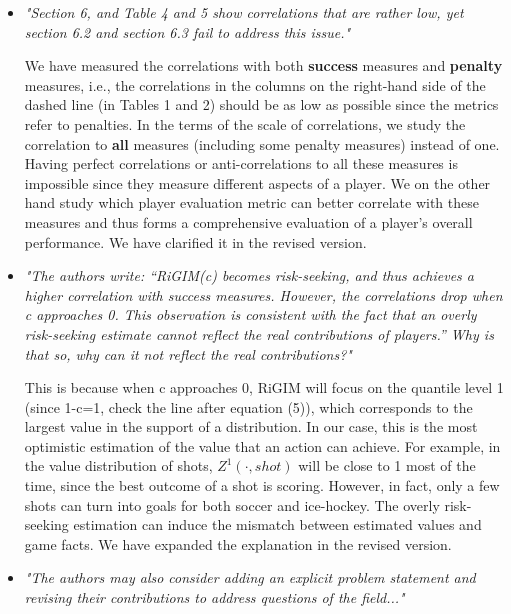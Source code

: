 \documentclass[letterpaper]{article} %
\begin{document}
\begin{itemize}
    [Gal2016] Gal, Yarin. "Uncertainty in deep learning." PhD thesis, 2016.

    \item {\it "Section 6, and Table 4 and 5 show correlations that are rather low, yet section 6.2 and section 6.3 fail to address this issue."}

    We have measured the correlations with both {\bf success} measures and {\bf penalty} measures, i.e., the correlations in the columns on the right-hand side of the dashed line (in Tables 1 and 2) should be as low as possible since the metrics refer to penalties.  In the terms of the scale of correlations, we study the correlation to {\bf all} measures (including some penalty measures) instead of one. Having perfect correlations or anti-correlations to all these measures is impossible since they measure different aspects of a player. We on the other hand study which player evaluation metric can better correlate with these measures and thus forms a comprehensive evaluation of a player's overall performance.  We have clarified it in the revised version.\medskip

    \item {\it "The authors write: “RiGIM(c) becomes risk-seeking, and thus achieves a higher correlation with success measures. However, the correlations drop when c approaches 0. This observation is consistent with the fact that an overly risk-seeking estimate cannot reflect the real contributions of players.” Why is that so, why can it not reflect the real contributions?"}

    This is because when c approaches 0, RiGIM will focus on the quantile level 1 (since 1-c=1, check the line after equation (5)), which corresponds to the largest value in the support of a distribution. In our case, this is the most optimistic estimation of the value that an action can achieve. For example, in the value distribution of shots, $Z^{1}(\cdot,shot)$ will be close to 1 most of the time, since the best outcome of a shot is scoring. However, in fact, only a few shots can turn into goals for both soccer and ice-hockey. The overly risk-seeking estimation can induce the mismatch between estimated values and game facts. We have expanded the explanation in the revised version.\medskip

    \item {\it "The authors may also consider adding an explicit problem statement and revising their contributions to address questions of the field..."}


\end{itemize}
\end{document}
